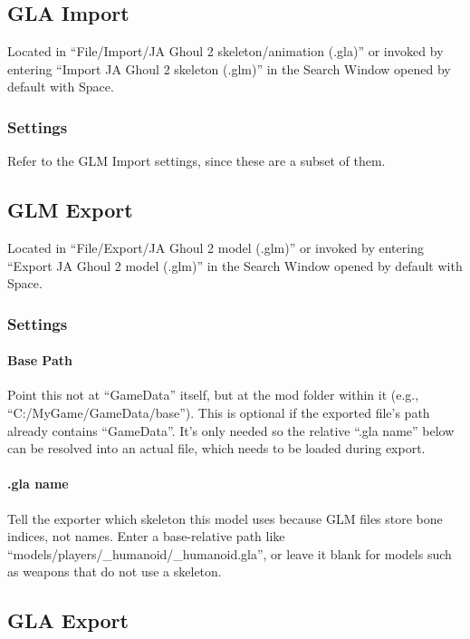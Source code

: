 \documentclass[a4paper,10pt]{article}
\begin{document}
 
 \subsection{GLA Import}
 
 Located in ``File/Import/JA Ghoul 2 skeleton/animation (.gla)'' or invoked by entering ``Import JA Ghoul 2
 skeleton (.glm)'' in the Search Window opened by default with Space.
 
 \subsubsection*{Settings}
 
 Refer to the GLM Import settings, since these are a subset of them.
 
 
 \subsection{GLM Export}
 
 Located in ``File/Export/JA Ghoul 2 model (.glm)'' or invoked by entering ``Export JA Ghoul 2 model (.glm)''
 in the Search Window opened by default with Space.
 
 \subsubsection*{Settings}
 
\paragraph*{Base Path}
Point this not at ``GameData'' itself, but at the mod folder within it (e.g., ``C:/MyGame/GameData/base'').
This is optional if the exported file's path already contains ``GameData''. It's only needed so the relative
``.gla name'' below can be resolved into an actual file, which needs to be loaded during export.

\paragraph*{.gla name}
Tell the exporter which skeleton this model uses because GLM files store bone indices, not names. Enter a
base-relative path like ``models/players/\_humanoid/\_humanoid.gla'', or leave it blank for models such as
weapons that do not use a skeleton.
 
 
 \subsection{GLA Export}
 
\end{document}
